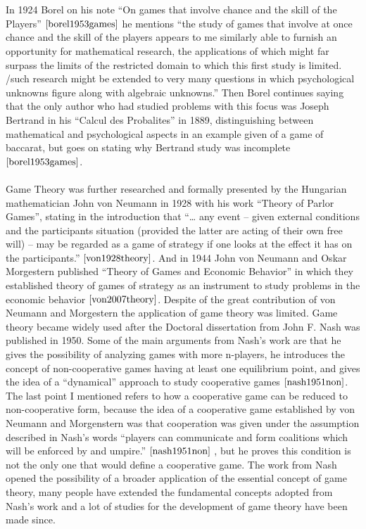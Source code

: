 \\\\ In 1924 Borel on his note ``On games that involve chance and the skill of the Players'' $\cite{borel1953games}$ he mentions  ``the study of games that involve at once chance and the skill of the players appears to me similarly able to furnish an opportunity for mathematical research, the applications of which might far surpass the limits of the restricted domain to which this first study is limited. /such research might be extended to very many questions in which psychological unknowns figure along with algebraic unknowns.'' Then Borel continues saying that the only author who had studied problems with this focus was Joseph Bertrand in his ``Calcul des Probalites'' in 1889, distinguishing between mathematical and psychological aspects in an example given of a game of baccarat, but goes on stating why Bertrand study was incomplete $\cite{borel1953games}$.
\\\\ Game Theory was further researched and formally presented by the Hungarian mathematician John von Neumann in 1928 with his work “Theory of Parlor Games”, stating in the introduction that ``… any event – given external conditions and the participants situation (provided the latter are acting of their own free will) – may be regarded as a game of strategy if one looks at the effect it has on the participants.'' $\cite{von1928theory}$. And in 1944 John von Neumann and Oskar Morgestern published ``Theory of Games and Economic Behavior'' in which they established theory of games of strategy as an instrument to study problems in the economic behavior $\cite{von2007theory}$. 
Despite of the great contribution of von Neumann and Morgestern the application of game theory was limited. Game theory became widely used after the Doctoral dissertation from John F. Nash was published in 1950. Some of the main arguments from Nash’s work are that he gives the possibility of analyzing games with more n-players, he introduces the concept of non-cooperative games having at least one equilibrium point, and gives the idea of a “dynamical” approach to study cooperative games $\cite{nash1951non}$. The last point I mentioned refers to how a cooperative game can be reduced to non-cooperative form, because the idea of a cooperative game established by von Neumann and Morgenstern was that cooperation was given under the assumption described in Nash’s words “players can communicate and form coalitions which will be enforced by and umpire.” $\cite{nash1951non}$ , but he proves this condition is not the only one that would define a cooperative game. The work from Nash opened the possibility of a broader application of the essential concept of game theory, many people have extended the fundamental concepts adopted from Nash's work and a lot of studies for the development of game theory have been made since.

